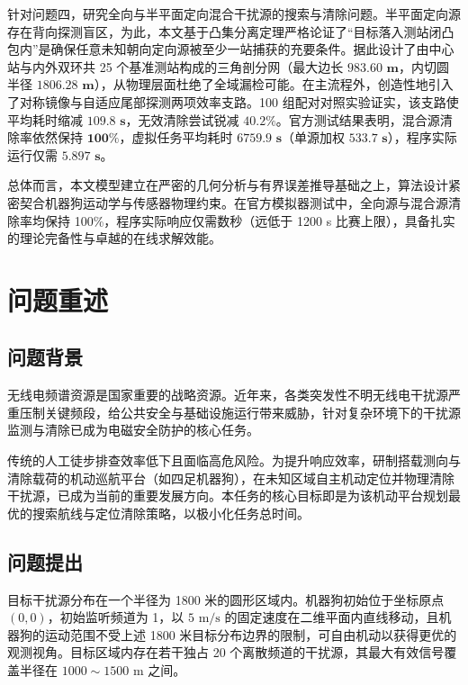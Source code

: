 \documentclass[zihao=-4,a4paper,UTF8]{ctexart}
\begin{document}
\begin{cumcmabstract}
针对问题四，研究全向与半平面定向混合干扰源的搜索与清除问题。半平面定向源存在背向探测盲区，为此，本文基于凸集分离定理严格论证了“目标落入测站闭凸包内”是确保任意未知朝向定向源被至少一站捕获的充要条件。据此设计了由中心站与内外双环共 25 个基准测站构成的三角剖分网（最大边长 $\mathbf{983.60\text{ m}}$，内切圆半径 $\mathbf{1806.28\text{ m}}$），从物理层面杜绝了全域漏检可能。在主流程外，创造性地引入了对称镜像与自适应尾部探测两项效率支路。100 组配对对照实验证实，该支路使平均耗时缩减 $\mathbf{109.8\text{ s}}$，无效清除尝试锐减 $\mathbf{40.2\%}$。官方测试结果表明，混合源清除率依然保持 $\mathbf{100\%}$，虚拟任务平均耗时 $\mathbf{6759.9\text{ s}}$（单源加权 $\mathbf{533.7\text{ s}}$），程序实际运行仅需 $\mathbf{5.897\text{ s}}$。

总体而言，本文模型建立在严密的几何分析与有界误差推导基础之上，算法设计紧密契合机器狗运动学与传感器物理约束。在官方模拟器测试中，全向源与混合源清除率均保持 100\%，程序实际响应仅需数秒（远低于 1200 s 比赛上限），具备扎实的理论完备性与卓越的在线求解效能。

\vspace{-0.4em}
\end{cumcmabstract}

\section{问题重述}

\subsection{问题背景}

无线电频谱资源是国家重要的战略资源。近年来，各类突发性不明无线电干扰源严重压制关键频段，给公共安全与基础设施运行带来威胁，针对复杂环境下的干扰源监测与清除已成为电磁安全防护的核心任务。

传统的人工徒步排查效率低下且面临高危风险。为提升响应效率，研制搭载测向与清除载荷的机动巡航平台（如四足机器狗），在未知区域自主机动定位并物理清除干扰源，已成为当前的重要发展方向。本任务的核心目标即是为该机动平台规划最优的搜索航线与定位清除策略，以极小化任务总时间。

\subsection{问题提出}

目标干扰源分布在一个半径为 1800 米的圆形区域内。机器狗初始位于坐标原点 $(0,0)$，初始监听频道为 1，以 $5\text{ m/s}$ 的固定速度在二维平面内直线移动，且机器狗的运动范围不受上述 1800 米目标分布边界的限制，可自由机动以获得更优的观测视角。目标区域内存在若干独占 20 个离散频道的干扰源，其最大有效信号覆盖半径在 $1000\sim 1500\text{ m}$ 之间。
\end{document}
